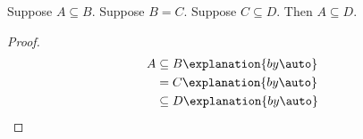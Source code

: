 


\begin{proposition}\label{phase7_composition_diamond_root}
    Suppose $A\subseteq B$.
    Suppose $B=C$.
    Suppose $C\subseteq D$.
    Then $A\subseteq D$.
\end{proposition}
\begin{proof}
    \begin{align*}
        A
            &\subseteq B
                \explanation{by \auto}
                \\
            &= C
                \explanation{by \auto}
                \\
            &\subseteq D
                \explanation{by \auto}
    \end{align*}
\end{proof}
